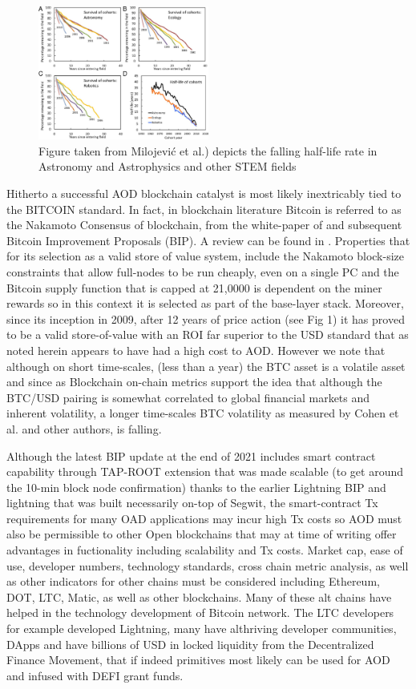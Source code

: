 \documentclass[final,5p,times,twocolumn,authoryear]{elsarticle}
\begin{document}
\begin{figure}[h!]
    \centering
    \label{fig:F4.large}
  \caption{Figure taken from Milojević et al.) depicts the falling half-life rate in Astronomy and Astrophysics and other STEM fields}
  \includegraphics[width=0.5\textwidth]{figs/F4.large.jpg}
\end{figure}
Hitherto a successful AOD blockchain catalyst is most likely inextricably tied to the BITCOIN standard. In fact, in blockchain literature Bitcoin is referred to as the Nakamoto Consensus of blockchain, from the white-paper of \cite{nak2009} and subsequent Bitcoin Improvement Proposals (BIP). A review can be found in \citet{Hansen2020Book}. Properties that for its selection as a valid  store of value system, include the Nakamoto block-size constraints that allow full-nodes to be run cheaply, even on a single PC and the Bitcoin supply function that is capped at 21,0000 is dependent on the miner rewards so in this context it is selected as part of the base-layer stack. Moreover, since its inception in 2009, after 12 years of price action (see Fig 1) it has proved to be a valid store-of-value with an ROI far superior to the USD standard that as noted herein appears to have had a high cost to AOD. However we note that although on short time-scales, (less than a year) the BTC asset is a volatile asset and since as Blockchain on-chain metrics support the idea that although the BTC/USD pairing is somewhat correlated to global financial markets and inherent volatility, a longer time-scales BTC volatility as measured by Cohen et al. and other authors, is falling. 

Although the latest BIP update at the end of 2021 includes smart contract capability through TAP-ROOT extension that was made scalable (to get around the 10-min block node confirmation) thanks to the earlier Lightning BIP and lightning that was built necessarily on-top of Segwit, the smart-contract Tx requirements for many OAD applications may incur high Tx costs so AOD must also be permissible to other Open blockchains that may at time of writing offer advantages in fuctionality including scalability and Tx costs. Market cap, ease of use, developer numbers, technology standards, cross chain metric analysis, as well as other indicators for other chains must be considered including Ethereum, DOT, LTC, Matic, as well as other blockchains. Many of these alt chains have helped in the technology development of Bitcoin network. The LTC developers for example developed Lightning, many have althriving developer communities, DApps and have billions of USD in locked liquidity from the Decentralized Finance Movement, that if indeed primitives most likely can be used for AOD and infused with DEFI grant funds. 
\end{document}
